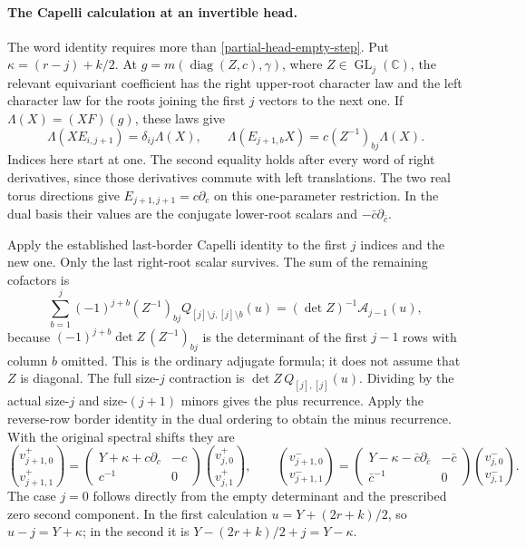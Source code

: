 \paragraph{The Capelli calculation at an invertible head.}
The word identity requires more than
\eqref{partial-head-empty-step}.  Put
$\kappa=(r-j)+k/2$.  At
$g=m(\operatorname{diag}(Z,c),\gamma)$, where
$Z\in\operatorname{GL}_j(\mathbb C)$, the relevant equivariant
coefficient has the right upper-root character law and the left
character law for the roots joining the first $j$ vectors to
the next one.  If $\Lambda(X)=(XF)(g)$, these laws give
\[
 \Lambda(XE_{i,j+1})=\delta_{ij}\Lambda(X),\qquad
 \Lambda(E_{j+1,b}X)=c(Z^{-1})_{bj}\Lambda(X).
\]
Indices here start at one.  The second equality holds after
every word of right derivatives, since those derivatives commute
with left translations.  The two real torus directions give
$E_{j+1,j+1}=c\partial_c$ on this one-parameter restriction.
In the dual basis their values are the conjugate lower-root
scalars and $-\bar c\partial_{\bar c}$.

Apply the established last-border Capelli identity to the first
$j$ indices and the new one.  Only the last right-root scalar
survives.  The sum of the remaining cofactors is
\[
 \sum_{b=1}^j(-1)^{j+b}(Z^{-1})_{bj}
       Q_{[j]\setminus j,[j]\setminus b}(u)
       =(\det Z)^{-1}\mathcal A_{j-1}(u),
\]
because
$(-1)^{j+b}\det Z\,(Z^{-1})_{bj}$ is the determinant of
the first $j-1$ rows with column $b$ omitted.  This is the
ordinary adjugate formula; it does not assume that $Z$ is
diagonal.  The full size-$j$ contraction is
$\det Z\,Q_{[j],[j]}(u)$.  Dividing by the actual size-$j$
and size-$(j+1)$ minors gives the plus recurrence.  Apply the
reverse-row border identity in the dual ordering to obtain the
minus recurrence.  With the original spectral shifts they are
\begin{equation}\label{partial-head-letter-recurrence}
 \binom{v^+_{j+1,0}}{v^+_{j+1,1}}
  =\begin{pmatrix}Y+\kappa+c\partial_c&-c\\c^{-1}&0\end{pmatrix}
          \binom{v^+_{j,0}}{v^+_{j,1}},\qquad
 \binom{v^-_{j+1,0}}{v^-_{j+1,1}}
  =\begin{pmatrix}Y-\kappa-\bar c\partial_{\bar c}&-\bar c\\
                   \bar c^{-1}&0\end{pmatrix}
          \binom{v^-_{j,0}}{v^-_{j,1}}.
\end{equation}
The case $j=0$ follows directly from the empty determinant and
the prescribed zero second component.  In the first calculation
$u=Y+(2r+k)/2$, so $u-j=Y+\kappa$; in the second it is
$Y-(2r+k)/2+j=Y-\kappa$.

